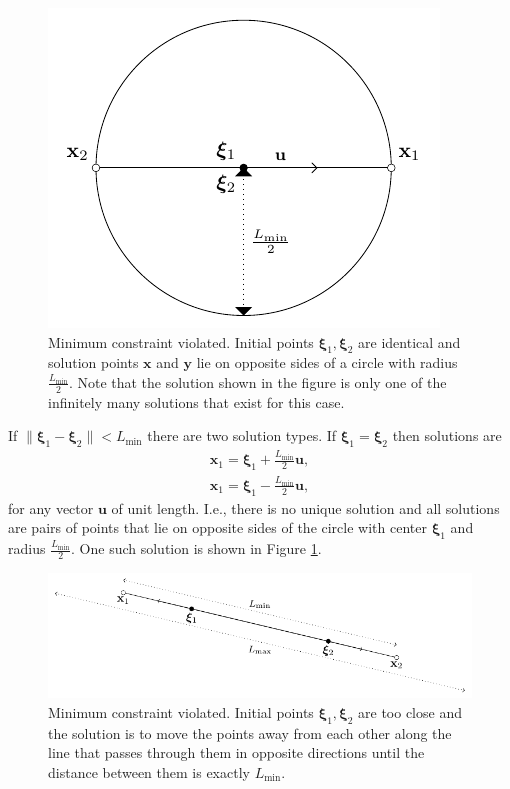 \begin{figure}[H]
	\centering
	\includegraphics[]{figures/constraint_handling/well_length_zero.pdf}
	\caption{Minimum constraint violated. Initial points $\boldsymbol{\xi}_1, \boldsymbol{\xi}_2$ 
	are identical and solution points $\textbf{x}$ and $\textbf{y}$ lie on opposite sides of a circle 
	with radius $\frac{L_{\min}}{2}$. Note that the solution shown in the figure is only one of 
	the infinitely many solutions that exist for this case.}
	\label{fig:min_violation_zero}
\end{figure}
%
If $\| \boldsymbol{\xi}_1 - \boldsymbol{\xi}_2 \| < L_{\min}$ 
there are two solution types. If $\boldsymbol{\xi}_1 = \boldsymbol{\xi}_2$ 
then solutions are
%
\begin{equation}
\begin{aligned}
\textbf{x}_1 = \boldsymbol{\xi}_1 + \frac{L_{\min}}{2} \textbf{u}, \\
\textbf{x}_1 = \boldsymbol{\xi}_1 - \frac{L_{\min}}{2} \textbf{u},
\end{aligned}
\label{eq:solution_min_triv}
\end{equation}
%
for any vector $\textbf{u}$ of unit length. I.e., there is no unique solution and
all solutions are pairs of
points that lie on opposite sides of the circle with center $\boldsymbol{\xi}_1$ 
and radius $\frac{L_{\min}}{2}$. One such solution is shown in Figure
\ref{fig:min_violation_zero}.
%
\begin{figure}[H]
	\centering
	\includegraphics[]{figures/constraint_handling/well_length_min.pdf}
	\caption{Minimum constraint violated. Initial points $\boldsymbol{\xi}_1, \boldsymbol{\xi}_2$ 
	are too close and the solution is to move the points away from each other along the line that
	passes through them in opposite directions until the distance between them is exactly $L_{\min}$.}
	\label{fig:min_violation}
\end{figure}
